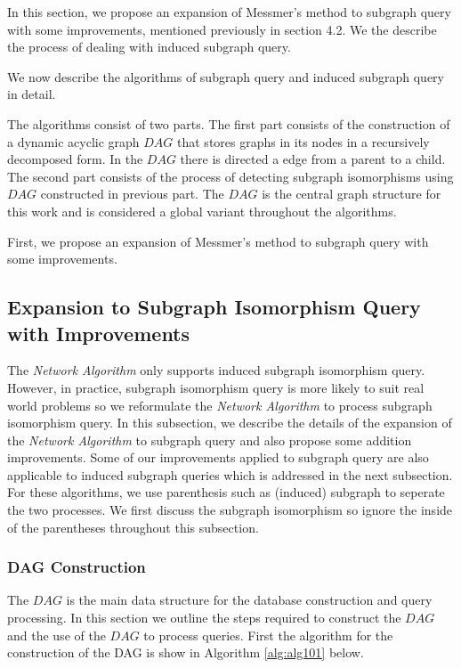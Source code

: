 In this section, we propose an expansion of Messmer's method to subgraph query with some improvements, mentioned previously in section 4.2.
We the describe the process of dealing with induced subgraph query.

We now describe the algorithms of subgraph query and induced subgraph query in detail.

The algorithms consist of two parts. The first part consists of the construction of a dynamic acyclic graph $DAG$ that stores graphs in its nodes 
in a recursively decomposed form. In the $DAG$ there is directed a edge from a parent to a child. The second part consists of the process of 
detecting subgraph isomorphisms using $DAG$ constructed in previous part. The $DAG$ is the central graph structure for this work and is considered 
a global variant throughout the algorithms. 

First, we propose an expansion of Messmer's method to subgraph query with some improvements.

\subsection{Expansion to Subgraph Isomorphism Query with Improvements}
The \textit{Network Algorithm} only supports induced subgraph isomorphism query. However, in practice,  subgraph isomorphism query is more likely to suit
real world problems so we reformulate the \textit{Network Algorithm} to process subgraph isomorphism query.
In this subsection, we describe the details of the expansion of the \textit{Network Algorithm} to subgraph query and also propose some addition improvements.
Some of our improvements applied to subgraph query are also applicable to induced subgraph queries which is addressed in the next subsection.
For these algorithms, we use parenthesis such as (induced) subgraph to seperate the two processes. We first discuss the subgraph isomorphism so ignore the 
inside of the parentheses throughout this subsection.

\subsubsection{DAG Construction}
The $DAG$ is the main data structure for the database construction and query processing. In this section we outline the steps required to construct 
the $DAG$ and the use of the $DAG$ to process queries. First the algorithm for the construction of the DAG is show in Algorithm \ref{alg:alg101} below.



